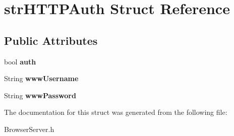 \hypertarget{structstr_h_t_t_p_auth}{\section{str\-H\-T\-T\-P\-Auth Struct Reference}
\label{structstr_h_t_t_p_auth}
}
\subsection*{Public Attributes}
\begin{DoxyCompactItemize}
\item 
\hypertarget{structstr_h_t_t_p_auth_a7e290deab2f75385844ebee550e3f96a}{bool {\bfseries auth}}\label{structstr_h_t_t_p_auth_a7e290deab2f75385844ebee550e3f96a}

\item 
\hypertarget{structstr_h_t_t_p_auth_a49696ae310a3d88033f6122fcb5450e1}{String {\bfseries www\-Username}}\label{structstr_h_t_t_p_auth_a49696ae310a3d88033f6122fcb5450e1}

\item 
\hypertarget{structstr_h_t_t_p_auth_ad6cb9a995a96f1793ea7cdf911ff8de5}{String {\bfseries www\-Password}}\label{structstr_h_t_t_p_auth_ad6cb9a995a96f1793ea7cdf911ff8de5}

\end{DoxyCompactItemize}


The documentation for this struct was generated from the following file\-:\begin{DoxyCompactItemize}
\item 
Browser\-Server.\-h\end{DoxyCompactItemize}
